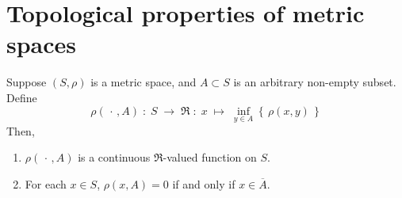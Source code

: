 

\section{Topological properties of metric spaces}
\setcounter{theorem}{0}
\setcounter{equation}{0}


\renewcommand{\theenumi}{\roman{enumi}}
\renewcommand{\labelenumi}{\textnormal{(\theenumi)}$\;\;$}


\begin{lemma}
\label{LemmaRho}
\quad
Suppose $\left(S,\rho\right)$ is a metric space, and $A \subset S$ is an arbitrary non-empty subset.
Define
\begin{equation*}
\rho(\,\cdot\,,A) \;:\; S \;\longrightarrow\; \Re \;:\; x \;\longmapsto\; \inf_{y\in A}\left\{\,\rho(x,y)\,\right\}
\end{equation*}
Then,
\begin{enumerate}
\item	$\rho(\,\cdot\,,A)$ is a continuous $\Re$-valued function on $S$.
\item	For each $x \in S$, $\rho(x,A) = 0$ if and only if $x \in \overline{A}$.
\end{enumerate}
\end{lemma}
\proof
